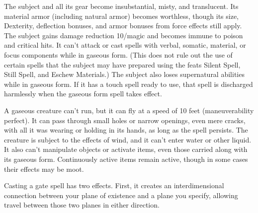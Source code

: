 \begin{multicols}{2}
\begin{small}
\noindent The subject and all its gear become insubstantial, misty, and translucent. Its material armor (including natural armor) becomes worthless, though its size, Dexterity, deflection bonuses, and armor bonuses from force effects still apply. The subject gains damage reduction 10/magic and becomes immune to poison and critical hits. It can't attack or cast spells with verbal, somatic, material, or focus components while in gaseous form. (This does not rule out the use of certain spells that the subject may have prepared using the feats Silent Spell, Still Spell, and Eschew Materials.) The subject also loses supernatural abilities while in gaseous form. If it has a touch spell ready to use, that spell is discharged harmlessly when the gaseous form spell takes effect.

\smallskip\noindent A gaseous creature can't run, but it can fly at a speed of 10 feet (maneuverability perfect). It can pass through small holes or narrow openings, even mere cracks, with all it was wearing or holding in its hands, as long as the spell persists. The creature is subject to the effects of wind, and it can't enter water or other liquid. It also can't manipulate objects or activate items, even those carried along with its gaseous form. Continuously active items remain active, though in some cases their effects may be moot.


\noindent Casting a gate spell has two effects. First, it creates an interdimensional connection between your plane of existence and a plane you specify, allowing travel between those two planes in either direction.


\end{small}
\end{multicols}

